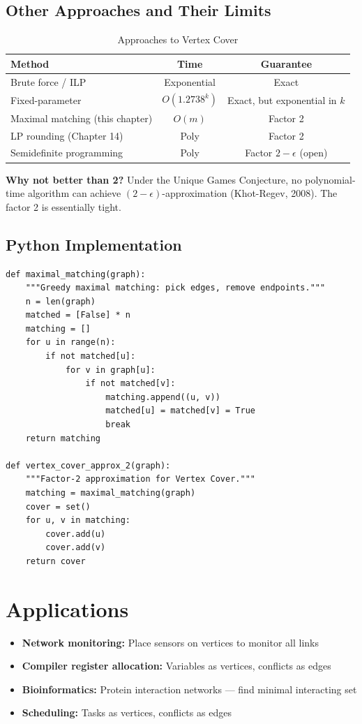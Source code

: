 \documentclass[11pt,oneside]{book}
\begin{document}
\subsection{Other Approaches and Their Limits}

\begin{table}[H]
\centering
\caption{Approaches to Vertex Cover}
\begin{tabular}{lcc}
\toprule
Method & Time & Guarantee \\
\midrule
Brute force / ILP & Exponential & Exact \\
Fixed-parameter & $O(1.2738^k)$ & Exact, but exponential in $k$ \\
Maximal matching (this chapter) & $O(m)$ & Factor 2 \\
LP rounding (Chapter 14) & Poly & Factor 2 \\
Semidefinite programming & Poly & Factor $2-\epsilon$ (open) \\
\bottomrule
\end{tabular}
\end{table}

\textbf{Why not better than 2?} Under the Unique Games Conjecture, no polynomial-time algorithm can achieve $(2-\epsilon)$-approximation (Khot-Regev, 2008). The factor 2 is essentially tight.

\subsection{Python Implementation}

\begin{lstlisting}[style=python, caption=Vertex Cover 2-Approximation]
def maximal_matching(graph):
    """Greedy maximal matching: pick edges, remove endpoints."""
    n = len(graph)
    matched = [False] * n
    matching = []
    for u in range(n):
        if not matched[u]:
            for v in graph[u]:
                if not matched[v]:
                    matching.append((u, v))
                    matched[u] = matched[v] = True
                    break
    return matching

def vertex_cover_approx_2(graph):
    """Factor-2 approximation for Vertex Cover."""
    matching = maximal_matching(graph)
    cover = set()
    for u, v in matching:
        cover.add(u)
        cover.add(v)
    return cover
\end{lstlisting}

\section{Applications}
\begin{itemize}
    \item \textbf{Network monitoring:} Place sensors on vertices to monitor all links
    \item \textbf{Compiler register allocation:} Variables as vertices, conflicts as edges
    \item \textbf{Bioinformatics:} Protein interaction networks — find minimal interacting set
    \item \textbf{Scheduling:} Tasks as vertices, conflicts as edges
\end{itemize}
\end{document}
